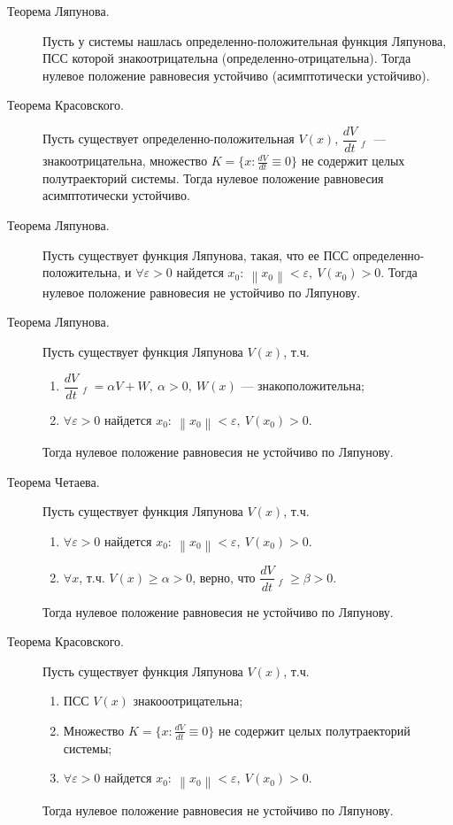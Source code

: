 \documentclass[a4paper,12pt]{scrartcl}
\DeclareMathOperator{\stick}{\biggl|}
\newcommand{\norm}[1]{\left\lVert #1 \right\rVert}
\begin{document}
\begin{description}
 \item[Теорема Ляпунова.] Пусть у системы нашлась определенно-положительная функция Ляпунова, ПСС которой знакоотрицательна (определенно-отрицательна). Тогда нулевое положение равновесия устойчиво (асимптотически устойчиво). 
 \item[Теорема Красовского.] Пусть существует определенно-положительная $V(x)$, $\dfrac{dV}{dt}\stick_f$ --- знакоотрицательна, множество $K = \{x: \frac{dV}{dt} \equiv 0\}$ не содержит целых полутраекторий системы. Тогда нулевое положение равновесия асимптотически устойчиво.
 \item[Теорема Ляпунова.] Пусть существует функция Ляпунова, такая, что ее ПСС определенно-положительна, и $\forall\varepsilon>0$ найдется $x_0:\ \norm{x_0}<\varepsilon,\ V(x_0)>0$. Тогда нулевое положение равновесия не устойчиво по Ляпунову. 
 \item[Теорема Ляпунова.] Пусть существует функция Ляпунова $V(x)$, т.ч.
\begin{enumerate}
 \item $\dfrac{dV}{dt}\stick_f = \alpha V + W,\ \alpha>0,\ W(x)$ --- знакоположительна;
 \item $\forall\varepsilon>0$ найдется $x_0:\ \norm{x_0}<\varepsilon,\ V(x_0)>0$.
\end{enumerate}
Тогда нулевое положение равновесия не устойчиво по Ляпунову.
 \item[Теорема Четаева.] Пусть существует функция Ляпунова $V(x)$, т.ч.
\begin{enumerate}
 \item $\forall\varepsilon>0$ найдется $x_0:\ \norm{x_0}<\varepsilon,\ V(x_0)>0$.
 \item $\forall x$, т.ч. $V(x)\geqslant\alpha>0$, верно, что $\dfrac{dV}{dt}\stick_f \geqslant \beta >0$.
\end{enumerate}
Тогда нулевое положение равновесия не устойчиво по Ляпунову.
 \item[Теорема Красовского.] Пусть существует функция Ляпунова $V(x)$, т.ч.
\begin{enumerate}
 \item ПСС $V(x)$ знакооотрицательна;
 \item Множество $K = \{x: \frac{dV}{dt} \equiv 0\}$ не содержит целых полутраекторий системы;
 \item $\forall\varepsilon>0$ найдется $x_0:\ \norm{x_0}<\varepsilon,\ V(x_0)>0$.
\end{enumerate}
Тогда нулевое положение равновесия не устойчиво по Ляпунову.
\end{description}
\end{document}
